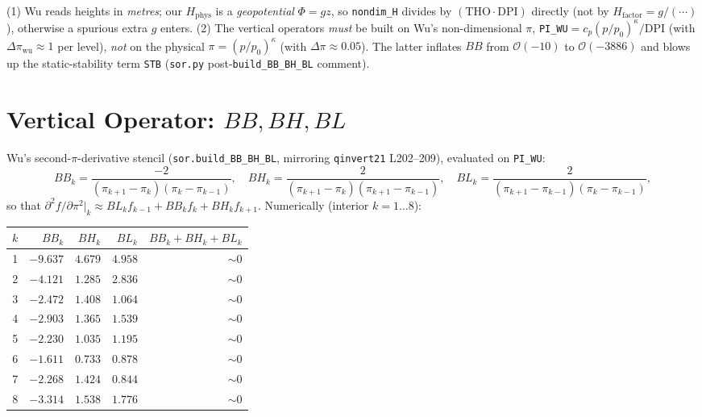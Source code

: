\begin{warnbox}
(1) Wu reads heights in \emph{metres}; our $H_{\text{phys}}$ is a
\emph{geopotential} $\Phi=gz$, so \texttt{nondim\_H} divides by
$(\mathrm{THO}\cdot\mathrm{DPI})$ directly (not by $H_{\text{factor}}=g/(\cdots)$),
otherwise a spurious extra $g$ enters.
(2) The vertical operators \emph{must} be built on Wu's non-dimensional
$\pi$, \texttt{PI\_WU}$=c_p(p/p_0)^\kappa/\mathrm{DPI}$ (with
$\Delta\pi_{\text{wu}}\!\approx\!1$ per level), \emph{not} on the
physical $\pi=(p/p_0)^\kappa$ (with $\Delta\pi\!\approx\!0.05$).  The
latter inflates $BB$ from $\mathcal{O}(-10)$ to $\mathcal{O}(-3886)$ and
blows up the static-stability term \texttt{STB} (\texttt{sor.py}
post-\texttt{build\_BB\_BH\_BL} comment).
\end{warnbox}

\section{Vertical Operator: \texorpdfstring{$BB,BH,BL$}{BB,BH,BL}}
\label{sec:wu_vertical}

Wu's second-$\pi$-derivative stencil (\texttt{sor.build\_BB\_BH\_BL},
mirroring \texttt{qinvert21} L202--209), evaluated on \texttt{PI\_WU}:
\begin{equation}
BB_k = \frac{-2}{(\pi_{k+1}{-}\pi_k)(\pi_k{-}\pi_{k-1})},\quad
BH_k = \frac{2}{(\pi_{k+1}{-}\pi_k)(\pi_{k+1}{-}\pi_{k-1})},\quad
BL_k = \frac{2}{(\pi_{k+1}{-}\pi_{k-1})(\pi_k{-}\pi_{k-1})},
\end{equation}
so that $\partial^2 f/\partial\pi^2|_k \approx BL_k f_{k-1}+BB_k f_k+BH_k f_{k+1}$.
Numerically (interior $k=1\ldots8$):
\begin{center}\small
\begin{tabular}{rrrrr}
\toprule
$k$ & $BB_k$ & $BH_k$ & $BL_k$ & $BB_k{+}BH_k{+}BL_k$ \\
\midrule
1 & $-9.637$ & $4.679$ & $4.958$ & $\sim 0$ \\
2 & $-4.121$ & $1.285$ & $2.836$ & $\sim 0$ \\
3 & $-2.472$ & $1.408$ & $1.064$ & $\sim 0$ \\
4 & $-2.903$ & $1.365$ & $1.539$ & $\sim 0$ \\
5 & $-2.230$ & $1.035$ & $1.195$ & $\sim 0$ \\
6 & $-1.611$ & $0.733$ & $0.878$ & $\sim 0$ \\
7 & $-2.268$ & $1.424$ & $0.844$ & $\sim 0$ \\
8 & $-3.314$ & $1.538$ & $1.776$ & $\sim 0$ \\
\bottomrule
\end{tabular}
\end{center}

